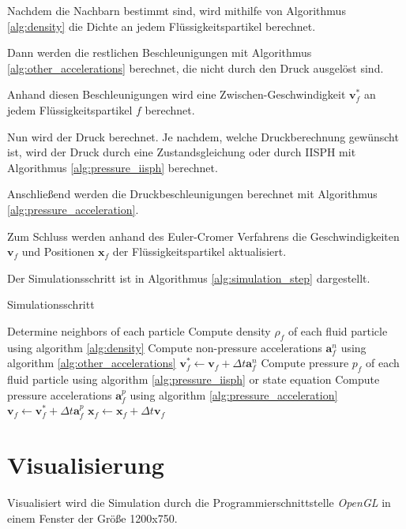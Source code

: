 \documentclass{scrreprt}
\begin{document}
Nachdem die Nachbarn bestimmt sind, wird mithilfe von Algorithmus \ref{alg:density} die Dichte an jedem Flüssigkeitspartikel berechnet.

Dann werden die restlichen Beschleunigungen mit Algorithmus \ref{alg:other_accelerations} berechnet, die nicht durch den Druck ausgelöst sind.

Anhand diesen Beschleunigungen wird eine Zwischen-Geschwindigkeit $\textbf{v}_f^*$ an jedem Flüssigkeitspartikel $f$ berechnet.

Nun wird der Druck berechnet. Je nachdem, welche Druckberechnung gewünscht ist,
wird der Druck durch eine Zustandsgleichung oder durch IISPH mit Algorithmus \ref{alg:pressure_iisph} berechnet.

Anschließend werden die Druckbeschleunigungen berechnet mit Algorithmus \ref{alg:pressure_acceleration}.

Zum Schluss werden anhand des Euler-Cromer Verfahrens die Geschwindigkeiten $\textbf{v}_f$ und Positionen $\textbf{x}_f$ der Flüssigkeitspartikel aktualisiert.

Der Simulationsschritt ist in Algorithmus \ref{alg:simulation_step} dargestellt.

\begin{algorithm}
    \caption{Simulationsschritt}
    \label{alg:simulation_step}
    \begin{algorithmic}[1]
        \State Determine neighbors of each particle
        \State Compute density $\rho_f$ of each fluid particle using algorithm \ref{alg:density}
        \State Compute non-pressure accelerations $\textbf{a}_f^n$ using algorithm \ref{alg:other_accelerations}
            \State $\textbf{v}_f^* \gets \textbf{v}_f + \Delta t \textbf{a}_f^n$
        \EndFor
        \State Compute pressure $p_f$ of each fluid particle using algorithm \ref{alg:pressure_iisph} or state equation
        \State Compute pressure accelerations $\textbf{a}_f^p$ using algorithm \ref{alg:pressure_acceleration}
            \State $\textbf{v}_f \gets \textbf{v}_f^* + \Delta t \textbf{a}_f^p$
        \EndFor
            \State $\textbf{x}_f \gets \textbf{x}_f + \Delta t \textbf{v}_f$
        \EndFor
        \State 
    \end{algorithmic}
    \end{algorithm}


\section{Visualisierung}
Visualisiert wird die Simulation durch die Programmierschnittstelle \textit{OpenGL} in einem Fenster der Größe 1200x750.
\end{document}
